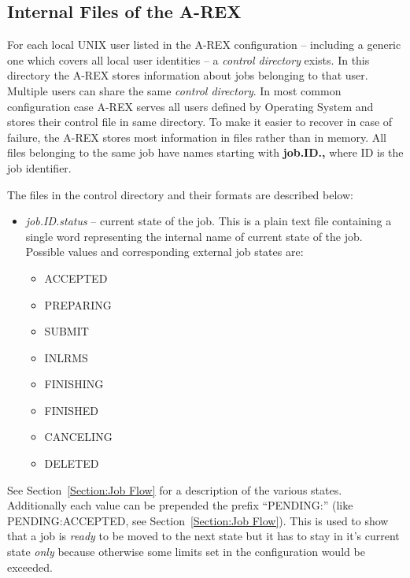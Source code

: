 \documentclass{article}                            %
\begin{document}
\subsection{Internal Files of the A-REX}

For each local UNIX user listed in the A-REX configuration -- including
a generic one which covers all local user identities -- a \textit{control
directory} exists. In this directory the A-REX stores information
about jobs belonging to that user. Multiple users can share the same
\textit{control directory}. In most common configuration case A-REX
serves all users defined by Operating System and stores their control
file in same directory. To make it easier to recover in case of failure,
the A-REX stores most information in files rather than in memory.
All files belonging to the same job have names starting with \textbf{job.ID.,}
where ID is the job identifier.

The files in the control directory and their formats are described
below:

\begin{itemize}
\item \textit{job.ID.status} -- current state of the job. This is a plain
text file containing a single word representing the internal name
of current state of the job. Possible values and corresponding external
job states are:

\begin{itemize}
\item ACCEPTED
\item PREPARING
\item SUBMIT
\item INLRMS
\item FINISHING
\item FINISHED
\item CANCELING
\item DELETED
\end{itemize}
\end{itemize}

See Section~\ref{Section:Job Flow} for a description of the various
states. Additionally each value can be prepended the prefix {}``PENDING:''
(like PENDING:ACCEPTED, see Section~\ref{Section:Job Flow}). This
is used to show that a job is \emph{ready} to be moved to the next
state but it has to stay in it's current state \emph{only} because
otherwise some limits set in the configuration would be exceeded.
\end{document}
